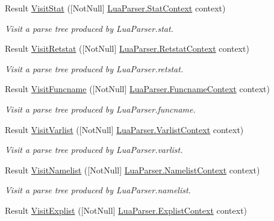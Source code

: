 \begin{DoxyCompactItemize}
Result \mbox{\hyperlink{interfacezlua_1_1_i_lua_visitor_a8d7c64b132803afd5d1fd6601c273f76}{Visit\+Stat}} (\mbox{[}Not\+Null\mbox{]} \mbox{\hyperlink{classzlua_1_1_lua_parser_1_1_stat_context}{Lua\+Parser.\+Stat\+Context}} context)
\begin{DoxyCompactList}\small\item\em Visit a parse tree produced by Lua\+Parser.\+stat. \end{DoxyCompactList}\item 
Result \mbox{\hyperlink{interfacezlua_1_1_i_lua_visitor_a0cba8f1a92102af4f881132e17be76f2}{Visit\+Retstat}} (\mbox{[}Not\+Null\mbox{]} \mbox{\hyperlink{classzlua_1_1_lua_parser_1_1_retstat_context}{Lua\+Parser.\+Retstat\+Context}} context)
\begin{DoxyCompactList}\small\item\em Visit a parse tree produced by Lua\+Parser.\+retstat. \end{DoxyCompactList}\item 
Result \mbox{\hyperlink{interfacezlua_1_1_i_lua_visitor_a125d3084a4d08cdfcea09f917afdf222}{Visit\+Funcname}} (\mbox{[}Not\+Null\mbox{]} \mbox{\hyperlink{classzlua_1_1_lua_parser_1_1_funcname_context}{Lua\+Parser.\+Funcname\+Context}} context)
\begin{DoxyCompactList}\small\item\em Visit a parse tree produced by Lua\+Parser.\+funcname. \end{DoxyCompactList}\item 
Result \mbox{\hyperlink{interfacezlua_1_1_i_lua_visitor_aadf416d9a85416107f278f794421819e}{Visit\+Varlist}} (\mbox{[}Not\+Null\mbox{]} \mbox{\hyperlink{classzlua_1_1_lua_parser_1_1_varlist_context}{Lua\+Parser.\+Varlist\+Context}} context)
\begin{DoxyCompactList}\small\item\em Visit a parse tree produced by Lua\+Parser.\+varlist. \end{DoxyCompactList}\item 
Result \mbox{\hyperlink{interfacezlua_1_1_i_lua_visitor_a6e378a829595016d1d812a7d0b7c9048}{Visit\+Namelist}} (\mbox{[}Not\+Null\mbox{]} \mbox{\hyperlink{classzlua_1_1_lua_parser_1_1_namelist_context}{Lua\+Parser.\+Namelist\+Context}} context)
\begin{DoxyCompactList}\small\item\em Visit a parse tree produced by Lua\+Parser.\+namelist. \end{DoxyCompactList}\item 
Result \mbox{\hyperlink{interfacezlua_1_1_i_lua_visitor_a6460b930bcd8c394def92c3cfb519d0e}{Visit\+Explist}} (\mbox{[}Not\+Null\mbox{]} \mbox{\hyperlink{classzlua_1_1_lua_parser_1_1_explist_context}{Lua\+Parser.\+Explist\+Context}} context)

\end{DoxyCompactItemize}
